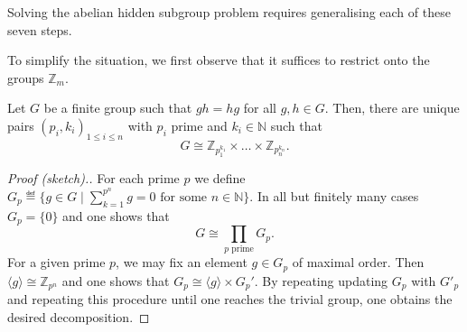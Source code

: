 \documentclass[a4paper, oneside, 12pt]{amsart}
\begin{document}
Solving the abelian hidden subgroup problem requires generalising each of these seven steps.

To simplify the situation, we first observe that it suffices to restrict onto the groups \( \mathbb{Z}_{m}\).

\begin{theorem}\label{thm:fundamental-thm-fg-abelian-groups}
  Let \(G\) be a finite group such that \(gh=hg\) for all \(g, h \in G\).
  Then, there are unique pairs \((p_{i},k_{i})_{1\leq i \leq n }\) with \(p_{i}\) prime and \(k_{i} \in \mathbb{N}\) such that
  \begin{equation}
    G\cong \mathbb{Z}_{p_{1}^{k_{1}}} \times \dots \times \mathbb{Z}_{p_{n}^{k_{n}}}.
  \end{equation}
\end{theorem}
\begin{proof}[Proof (sketch).]
  For each prime \(p\) we define \(G_{p}\eqdef\{g\in G \mid \sum_{k=1}^{p^{n}} g =0 \text{ for some } n\in \mathbb{N}\}\).
  In all but finitely many cases \(G_{p}= \{0\}\) and one shows that
  \begin{equation*}
    G \cong \prod_{p \text{ prime}} G_{p}.
  \end{equation*}
  For a given prime \(p\), we may fix an element \(g\in G_{p}\) of maximal order.
  Then \(\langle g\rangle \cong \mathbb{Z}_{p^{n}}\) and one shows that \(G_{p}\cong \langle g \rangle \times G_{p}'\).
  By repeating updating \(G_{p}\) with  \(G'_{p}\) and repeating this procedure until one reaches the trivial group, one obtains the desired decomposition.
\end{proof}
\end{document}
